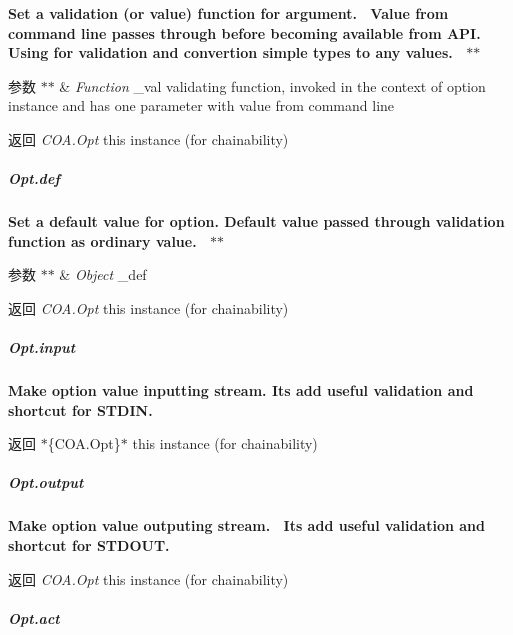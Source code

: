 {\bfseries {\bfseries {\bfseries {\bfseries  Set a validation (or value) function for argument.~\newline
 Value from command line passes through before becoming available from A\+PI.~\newline
 Using for validation and convertion simple types to any values.~\newline
 $\ast$$\ast$
\begin{DoxyParams}{参数}
{\em $\ast$$\ast$} & {\itshape Function} {\ttfamily \+\_\+val} validating function, invoked in the context of option instance and has one parameter with value from command line~\newline
 {\bfseries }\\
\hline
\end{DoxyParams}
\begin{DoxyReturn}{返回}
{\bfseries } {\itshape C\+O\+A.\+Opt} {\ttfamily this} instance (for chainability)
\end{DoxyReturn}
\subparagraph*{Opt.\+def}}}}}

{\bfseries {\bfseries {\bfseries {\bfseries  Set a default value for option. Default value passed through validation function as ordinary value.~\newline
 $\ast$$\ast$
\begin{DoxyParams}{参数}
{\em $\ast$$\ast$} & {\itshape Object} {\ttfamily \+\_\+def}~\newline
 {\bfseries }\\
\hline
\end{DoxyParams}
\begin{DoxyReturn}{返回}
{\bfseries } {\itshape C\+O\+A.\+Opt} {\ttfamily this} instance (for chainability)
\end{DoxyReturn}
\subparagraph*{Opt.\+input}}}}}

{\bfseries {\bfseries {\bfseries {\bfseries  Make option value inputting stream. It\textquotesingle{}s add useful validation and shortcut for S\+T\+D\+IN. {\bfseries \begin{DoxyReturn}{返回}
$\ast$\{C\+O\+A.\+Opt\}$\ast$ {\ttfamily this} instance (for chainability)
\end{DoxyReturn}
\subparagraph*{Opt.\+output}}}}}}

{\bfseries {\bfseries {\bfseries {\bfseries {\bfseries  Make option value outputing stream.~\newline
 It\textquotesingle{}s add useful validation and shortcut for S\+T\+D\+O\+UT.~\newline
 {\bfseries \begin{DoxyReturn}{返回}
{\itshape C\+O\+A.\+Opt} {\ttfamily this} instance (for chainability)
\end{DoxyReturn}
\subparagraph*{Opt.\+act}}}}}}}

